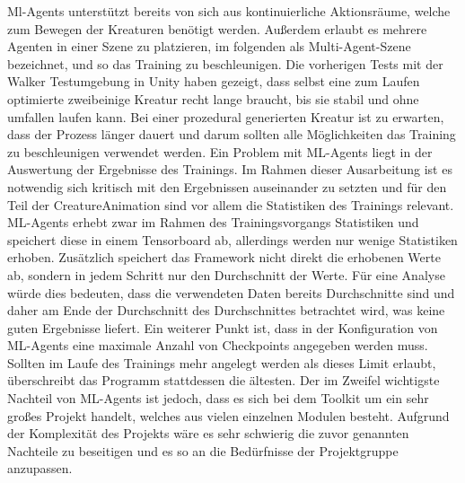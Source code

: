 Ml-Agents unterstützt bereits von sich aus kontinuierliche Aktionsräume, welche zum Bewegen der Kreaturen benötigt werden. Außerdem erlaubt es mehrere Agenten in einer Szene zu platzieren, im folgenden als Multi-Agent-Szene bezeichnet, und so das Training zu beschleunigen. Die vorherigen Tests mit der Walker Testumgebung in Unity \cite{walkerEnv} haben gezeigt, dass selbst eine zum Laufen optimierte zweibeinige Kreatur recht lange braucht, bis sie stabil und ohne umfallen laufen kann.
Bei einer prozedural generierten Kreatur ist zu erwarten, dass der Prozess länger dauert und darum sollten alle Möglichkeiten das Training zu beschleunigen verwendet werden.
Ein Problem mit ML-Agents liegt in der Auswertung der Ergebnisse des Trainings. Im Rahmen dieser Ausarbeitung ist es notwendig sich kritisch mit den Ergebnissen auseinander zu setzten und für den Teil der CreatureAnimation sind vor allem die Statistiken des Trainings relevant. ML-Agents erhebt zwar im Rahmen des Trainingsvorgangs Statistiken und speichert diese in einem Tensorboard ab, allerdings werden nur wenige Statistiken erhoben. Zusätzlich speichert das Framework nicht direkt die erhobenen Werte ab, sondern in jedem Schritt nur den Durchschnitt der Werte. Für eine Analyse würde dies bedeuten, dass die verwendeten Daten bereits Durchschnitte sind und daher am Ende der Durchschnitt des Durchschnittes betrachtet wird, was keine guten Ergebnisse liefert. 
Ein weiterer Punkt ist, dass in der Konfiguration von ML-Agents eine maximale Anzahl von Checkpoints angegeben werden muss. Sollten im Laufe des Trainings mehr angelegt werden als dieses Limit erlaubt, überschreibt das Programm stattdessen die ältesten.
Der im Zweifel wichtigste Nachteil von ML-Agents ist jedoch, dass es sich bei dem Toolkit um ein sehr großes Projekt handelt, welches aus vielen einzelnen Modulen besteht. Aufgrund der Komplexität des Projekts wäre es sehr schwierig die zuvor genannten Nachteile zu beseitigen und es so an die Bedürfnisse der Projektgruppe anzupassen.

